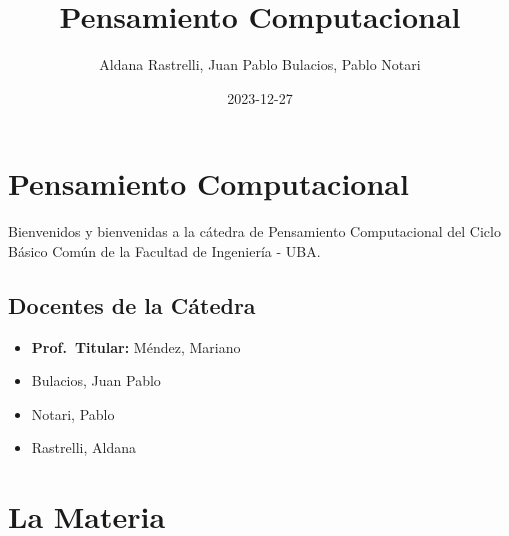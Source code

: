 \documentclass[
  letterpaper,
  DIV=11,
  numbers=noendperiod]{scrreprt}
\title{Pensamiento Computacional}
\author{Aldana Rastrelli, Juan Pablo Bulacios, Pablo Notari}
\date{2023-12-27}
\renewcommand*\contentsname{Table of contents}
\newcommand\contentsname{Table of contents}
\begin{document}
\maketitle
\ifdefined\Shaded\renewenvironment{Shaded}{\begin{tcolorbox}[frame hidden, interior hidden, breakable, borderline west={3pt}{0pt}{shadecolor}, enhanced, sharp corners, boxrule=0pt]}{\end{tcolorbox}}\fi

\renewcommand*\contentsname{Table of contents}
{
\hypersetup{linkcolor=}
\setcounter{tocdepth}{2}
\tableofcontents
}

\hypertarget{pensamiento-computacional}{%
\chapter*{Pensamiento Computacional}\label{pensamiento-computacional}}


Bienvenidos y bienvenidas a la cátedra de Pensamiento Computacional del
Ciclo Básico Común de la Facultad de Ingeniería - UBA.

\hypertarget{docentes-de-la-cuxe1tedra}{%
\section*{Docentes de la Cátedra}\label{docentes-de-la-cuxe1tedra}}


\begin{itemize}
\item
  \textbf{Prof.~Titular:} Méndez, Mariano
\item
  Bulacios, Juan Pablo
\item
  Notari, Pablo
\item
  Rastrelli, Aldana
\end{itemize}


\hypertarget{la-materia}{%
\chapter*{La Materia}\label{la-materia}}

\end{document}
